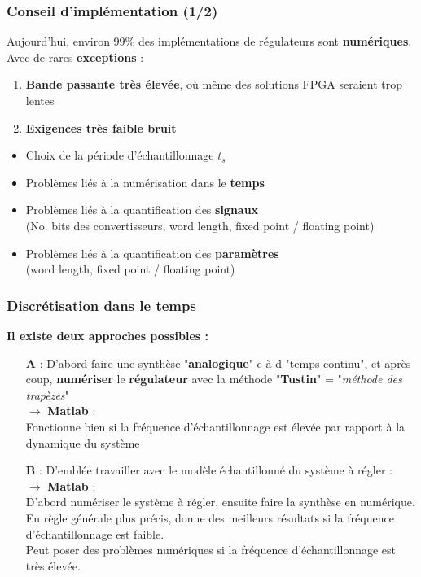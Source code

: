 \documentclass[document.tex]{subfiles}
\begin{document}
\subsubsection{Conseil d'implémentation (1/2)}

Aujourd'hui, environ $99\%$ des implémentations de régulateurs sont \textbf{numériques}.\\
Avec de rares \textbf{exceptions} : 
\begin{enumerate}
\item \textbf{Bande passante très élevée}, où même des solutions FPGA seraient trop lentes
\item \textbf{Exigences très faible bruit}
\end{enumerate}

\begin{itemize}
\item Choix de la période d'échantillonnage $t_s$ 
\item Problèmes liés à la numérisation dans le \textbf{temps}
\item Problèmes liés à la quantification des \textbf{signaux}\\
(No. bits des convertisseurs, word length, fixed point / floating point)
\item Problèmes liés à la quantification des \textbf{paramètres} \\
(word length, fixed point / floating point)
\end{itemize}

\subsubsection{Discrétisation dans le temps}

\textbf{Il existe deux approches possibles :}

\begin{enumerate}
\item [\textbf{A}] : D'abord faire une synthèse "\textbf{analogique}" c-à-d "temps continu", et après coup, \textbf{numériser} le \textbf{régulateur} avec la méthode "\textbf{Tustin}" = "\textit{méthode des trapèzes}"\\
$\rightarrow$ \textbf{Matlab} :  \\
Fonctionne bien si la fréquence d'échantillonnage est élevée par rapport à la dynamique du système
\item [\textbf{B}] : D'emblée travailler avec le modèle échantillonné du système à régler :\\ $\rightarrow$ \textbf{Matlab} :  \\
D'abord numériser le système à régler, ensuite faire la synthèse en numérique. En règle générale plus précis, donne des meilleurs résultats si la fréquence d'échantillonnage est faible.\\
Peut poser des problèmes numériques si la fréquence d'échantillonnage est très élevée.
\end{enumerate}
\end{document}
